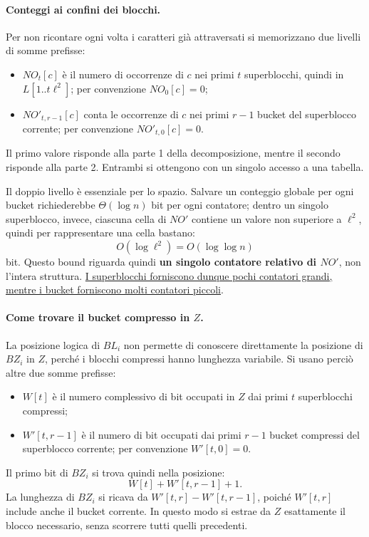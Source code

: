 \documentclass{article}
\theoremstyle{definition}
\numberwithin{equation}{section}
\begin{document}
\paragraph{Conteggi ai confini dei blocchi.}
Per non ricontare ogni volta i caratteri già attraversati si memorizzano due livelli di somme prefisse:
\begin{itemize}
    \item $NO_t[c]$ è il numero di occorrenze di $c$ nei primi $t$ superblocchi, quindi in $L[1..t\ell^2]$; per convenzione $NO_0[c]=0$;
    \item $NO'_{t,r-1}[c]$ conta le occorrenze di $c$ nei primi $r-1$ bucket del superblocco corrente; per convenzione $NO'_{t,0}[c]=0$.
\end{itemize}
Il primo valore risponde alla parte 1 della decomposizione, mentre il secondo risponde alla parte 2. Entrambi si ottengono con un singolo accesso a una tabella.

Il doppio livello è essenziale per lo spazio. Salvare un conteggio globale per ogni bucket richiederebbe $\Theta(\log n)$ bit per ogni contatore; dentro un singolo superblocco, invece, ciascuna cella di $NO'$ contiene un valore non superiore a $\ell^2$, quindi per rappresentare una cella bastano:
\[
    O(\log \ell^2)=O(\log\log n)
\]
bit. Questo bound riguarda quindi \textbf{un singolo contatore relativo di $NO'$}, non l'intera struttura. \uline{I superblocchi forniscono dunque pochi contatori grandi, mentre i bucket forniscono molti contatori piccoli}.

\paragraph{Come trovare il bucket compresso in \(Z\).}
La posizione logica di $BL_i$ non permette di conoscere direttamente la posizione di $BZ_i$ in $Z$, perché i blocchi compressi hanno lunghezza variabile. Si usano perciò altre due somme prefisse:
\begin{itemize}
    \item $W[t]$ è il numero complessivo di bit occupati in $Z$ dai primi $t$ superblocchi compressi;
    \item $W'[t,r-1]$ è il numero di bit occupati dai primi $r-1$ bucket compressi del superblocco corrente; per convenzione $W'[t,0]=0$.
\end{itemize}
Il primo bit di $BZ_i$ si trova quindi nella posizione:
\begin{equation}\label{eq:fm_occ_bucket_start}
    W[t]+W'[t,r-1]+1.
\end{equation}
La lunghezza di $BZ_i$ si ricava da $W'[t,r]-W'[t,r-1]$, poiché $W'[t,r]$ include anche il bucket corrente. In questo modo si estrae da $Z$ esattamente il blocco necessario, senza scorrere tutti quelli precedenti.
\end{document}
